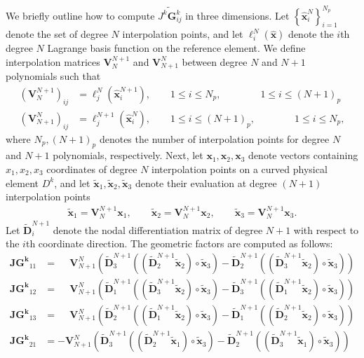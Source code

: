 \documentclass[preprint,10pt]{article}
\theoremstyle{definition}
\theoremstyle{lemma}
\theoremstyle{theorem}
\theoremstyle{assumption}
\renewcommand{\hat}{\widehat}
\renewcommand{\tilde}{\widetilde}
\newcommand{\LRp}[1]{\left( #1 \right)}
\newcommand{\LRc}[1]{\left\{ #1 \right\}}
\begin{document}
{We briefly outline how to compute $\tilde{J^k\bm{G}^k_{ij}}$ in three dimensions.  Let $\LRc{\hat{\bm{x}}^N_i}_{i=1}^{N_p}$ denote the set of degree $N$ interpolation points, and let $\ell^N_i(\hat{\bm{x}})$ denote the $i$th degree $N$ Lagrange basis function on the reference element.  We define interpolation matrices $\bm{V}_N^{N+1}$ and $\bm{V}^N_{N+1}$ between degree $N$ and $N+1$ polynomials such that 
\begin{align}
\LRp{\bm{V}_N^{N+1}}_{ij} &= \ell^N_j(\hat{\bm{x}}^{N+1}_i) , \qquad 1\leq i \leq N_p, \qquad \qquad 1\leq i \leq (N+1)_p\\
\LRp{\bm{V}^N_{N+1}}_{ij} &= \ell^{N+1}_j(\hat{\bm{x}}^{N}_i) , \qquad 1\leq i \leq (N+1)_p, \qquad \qquad 1\leq i \leq N_p, \nonumber
\end{align}
where $N_p, (N+1)_p$ denotes the number of interpolation points for degree $N$ and $N+1$ polynomials, respectively.  Next, let $\bm{x}_1,\bm{x}_2,\bm{x}_3$ denote vectors containing $x_1,x_2,x_3$ coordinates of degree $N$ interpolation points on a curved physical element $D^k$, and let $\tilde{\bm{x}}_1,\tilde{\bm{x}}_2,\tilde{\bm{x}}_3$ denote their evaluation at degree $(N+1)$ interpolation points
\begin{align}
\tilde{\bm{x}}_1 = \bm{V}_N^{N+1}\bm{x}_1, \qquad \tilde{\bm{x}}_2 = \bm{V}_N^{N+1}\bm{x}_2, \qquad \tilde{\bm{x}}_3 = \bm{V}_N^{N+1}\bm{x}_3.
\end{align}
Let $\tilde{\bm{D}}^{N+1}_i$ denote the nodal differentiation matrix of degree $N+1$ with respect to the $i$th coordinate direction.  The geometric factors are computed as follows:
\begin{align}
\bm{JG^k}_{11} &= \phantom{-}\bm{V}_{N+1}^N\LRp{\tilde{\bm{D}}^{N+1}_3 \LRp{\LRp{ \tilde{\bm{D}}^{N+1}_2 \tilde{\bm{x}}_2} \circ\tilde{\bm{x}}_3} - \tilde{\bm{D}}^{N+1}_2 \LRp{ \LRp{\tilde{\bm{D}}^{N+1}_3\tilde{\bm{x}}_2} \circ\tilde{\bm{x}}_3}} \\
\bm{JG^k}_{12} &= \phantom{-}\bm{V}_{N+1}^N\LRp{\tilde{\bm{D}}^{N+1}_1 \LRp{ \LRp{\tilde{\bm{D}}^{N+1}_3\tilde{\bm{x}}_2} \circ\tilde{\bm{x}}_3} - \tilde{\bm{D}}^{N+1}_3 \LRp{ \LRp{\tilde{\bm{D}}^{N+1}_1\tilde{\bm{x}}_2 }\circ\tilde{\bm{x}}_3}} \nonumber\\
\bm{JG^k}_{13} &= \phantom{-}\bm{V}_{N+1}^N{\LRp{\tilde{\bm{D}}^{N+1}_2 \LRp{\LRp{ \tilde{\bm{D}}^{N+1}_1\tilde{\bm{x}}_2} \circ\tilde{\bm{x}}_3} - \tilde{\bm{D}}^{N+1}_1 \LRp{\LRp{ \tilde{\bm{D}}^{N+1}_2\tilde{\bm{x}}_2} \circ\tilde{\bm{x}}_3}}} \nonumber\\
%
\bm{JG^k}_{21} &= -\bm{V}_{N+1}^N\LRp{\tilde{\bm{D}}^{N+1}_3 \LRp{\LRp{ \tilde{\bm{D}}^{N+1}_2 \tilde{\bm{x}}_1} \circ\tilde{\bm{x}}_3} - \tilde{\bm{D}}^{N+1}_2 \LRp{\LRp{ \tilde{\bm{D}}^{N+1}_3\tilde{\bm{x}}_1} \circ\tilde{\bm{x}}_3}} \nonumber \\

\end{align}}
\end{document}

